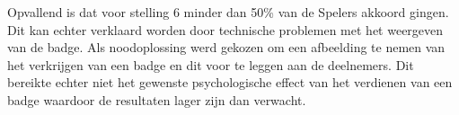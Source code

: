 Opvallend is dat voor stelling 6 minder dan 50\% van de Spelers akkoord gingen. Dit kan echter verklaard worden door technische problemen met het weergeven van de badge. Als noodoplossing werd gekozen om een afbeelding te nemen van het verkrijgen van een badge en dit voor te leggen aan de deelnemers. Dit bereikte echter niet het gewenste psychologische effect van het verdienen van een badge waardoor de resultaten lager zijn dan verwacht.



